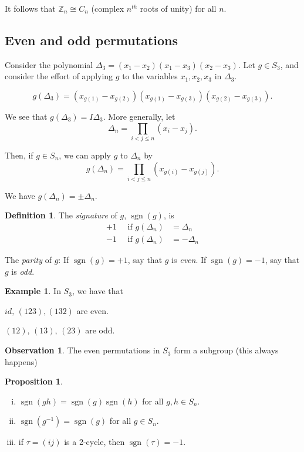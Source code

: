 \documentclass{article}
\theoremstyle{definition} \newtheorem*{definition}{Definition}
\newtheorem{proposition}[theorem]{Proposition}
\newtheorem*{exmp}{Example} \newtheorem*{exmps}{Examples}
\newtheorem*{obvs}{Observation}
\newcommand{\dtn}{\Delta_n} \newcommand{\gene}[1]{\langle #1 \rangle}
\newcommand{\ism}{\cong} \newcommand{\elemt}[2]{#1_{{#2}\sigma(#2)}}
\DeclareMathOperator{\sgn}{sgn} \DeclareMathOperator{\id}{id}
\begin{document}
\begin{remark} It follows that $\mathbb{Z}_n \ism C_n$ (complex $n^{th}$ roots
  of unity) for all $n$.  \end{remark}

\subsection{Even and odd permutations}

Consider the polynomial $\Delta_3 = (x_1 - x_2)(x_1 - x_3) (x_2 - x_3)$.  Let
$g \in S_3$, and consider the effort of applying $g$ to the variables $x_1,
x_2, x_3$ in $\Delta_3$.

$$g(\Delta_3) = (x_{g(1)} - x_{g(2)})(x_{g(1)} - x_{g(3)})(x_{g(2)} -
x_{g(3)}).$$

\noindent We see that $g(\Delta_3)=I\Delta_3$. More generally, let $$\Delta_n =
\prod_{i<j\leq n} (x_i - x_j ). $$ 

\noindent Then, if $g \in S_n$, we can apply $g$ to $\Delta_n$ by $$g(\Delta_n)
= \prod_{i<j\leq n}(x_{g(i)} - x_{g(j)}).$$

\noindent We have $g(\Delta_n) = \pm\Delta_n$.\\ \begin{definition} The
  \emph{signature} of $g$, $\sgn(g)$, is \begin{align*} +1 \quad \text{ if }
    g(\dtn) &= \dtn \\ -1 \quad \text{ if } g(\dtn) &= -\dtn \end{align*}
\end{definition}

The \emph{parity} of $g$: If $\sgn(g)=+1$, say that $g$ is \emph{even}.  If
$\sgn(g)=-1$, say that $g$ is \emph{odd}.\\

\begin{exmp}
  
In $S_3$, we have that 

$id,\,(1 2 3), (1 3 2)$ are even.

$(1 2),\, (1 3),\,(2 3)$ are odd.\\ \end{exmp} \begin{obvs}
  
The even permutations in $S_3$ form a subgroup (this always happens)\\
\end{obvs}


\begin{proposition} \label{prp:sgn}\hfill \begin{enumerate}[(i)] \item
        $\sgn(gh)=\sgn(g)\sgn(h)$ for all $g,h \in S_n$.  \item
        $\sgn(g^{-1})=\sgn(g)$ for all $g \in S_n$.  \item if $\tau=(i j)$ is a
          2-cycle, then $\sgn(\tau)=-1$.  \end{enumerate} \end{proposition}
\end{document}
